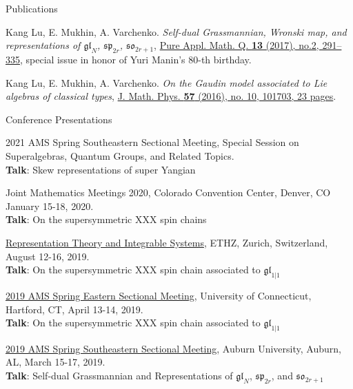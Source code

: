 \documentclass{resume} %
\begin{document}
\begin{rSection}{Publications}
\begin{etaremune}[leftmargin=0cm]
\item Kang Lu, E. Mukhin, A. Varchenko. 
{\it Self-dual Grassmannian, Wronski map, and representations of $\mathfrak{gl}_N$, $\mathfrak{sp}_{2r}$, $\mathfrak{so}_{2r+1}$}, \href{http://dx.doi.org/10.4310/PAMQ.2017.v13.n2.a4}{Pure Appl. Math. Q. {\bf 13} (2017), no.2, 291--335}, special issue in honor of Yuri Manin's 80-th birthday.
					
\item Kang Lu, E. Mukhin, A. Varchenko. 
{\it On the Gaudin model associated to Lie algebras of classical types}, \href{https://doi.org/10.1063/1.4964389}{J. Math. Phys. {\bf 57} (2016), no. 10, 101703, 23 pages}.
\end{etaremune}
\end{rSection}

\begin{rSection}{Conference Presentations}
\begin{rSubsection}{}{}
{}{}
  \item {2021 AMS Spring Southeastern Sectional Meeting, Special Session on Superalgebras, Quantum Groups, and Related Topics.\\
      \textbf{Talk}: Skew representations of super Yangian}\\
  \item {Joint Mathematics Meetings 2020, Colorado Convention Center, Denver, CO January 15-18, 2020.\\
        \textbf{Talk}: On the supersymmetric XXX spin chains}\\
  \item {\href{http://rtis2019.math.iupui.edu/}{Representation Theory and Integrable Systems}, ETHZ, Zurich, Switzerland, August 12-16, 2019. \\
		{\bf Talk}: On the supersymmetric XXX spin chain associated to $\mathfrak{gl}_{1|1}$}\\
  \item {\href{http://www.ams.org/meetings/sectional/2265_program.html}{2019 AMS Spring Eastern Sectional Meeting}, University of Connecticut, Hartford, CT, April 13-14, 2019. \\
        {\bf Talk}: On the supersymmetric XXX spin chain associated to $\mathfrak{gl}_{1|1}$}\\
  \item {\href{http://www.ams.org/meetings/sectional/2261_program.html}{2019 AMS Spring Southeastern Sectional Meeting}, Auburn University, Auburn, AL, March 15-17, 2019. \\
        {\bf Talk}: Self-dual Grassmannian and Representations of $\mathfrak{gl}_N$, $\mathfrak{sp}_{2r}$, and $\mathfrak{so}_{2r+1}$}\\

\end{rSubsection}
\end{rSection}
\end{document}
